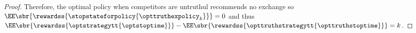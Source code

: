 \begin{proof}
    Therefore, the optimal policy when competitors are untruthul recommends no exchange so 
    \(
        \EE\sbr{
            \rewardss{
                \stopstateforpolicy{
                    \opttruthexpolicy_k
                }
            }
        }
        =0
    \)
    and thus
    \(
        \EE\sbr{
            \rewardss{
                \optstrategytt{
                    \optstoptime
                }
            }
        }
        -
        \EE\sbr{
            \rewardss{
                \opttruthstrategytt{
                    \opttruthstoptime
                }
            }
        }
        =k
    \).
\end{proof}  